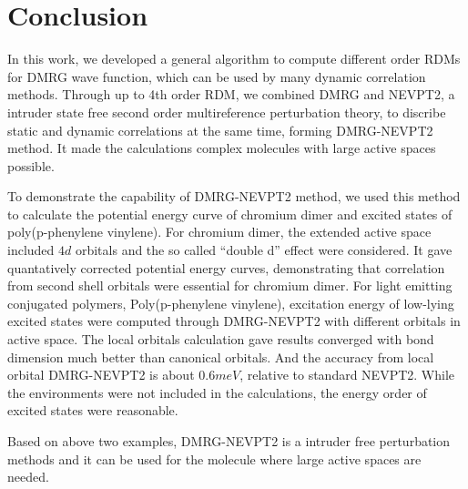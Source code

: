 
\section{Conclusion}

In this work, we developed a general algorithm to compute different order RDMs for DMRG wave function, which can be used by many dynamic correlation methods. 
Through up to 4th order RDM, we combined DMRG and NEVPT2, a intruder state free second order multireference perturbation theory,
to discribe static and dynamic correlations at the same time, forming DMRG-NEVPT2 method. It made the calculations complex molecules with large active spaces possible. 

To demonstrate the capability of DMRG-NEVPT2 method, we used this method to calculate the potential energy curve of chromium dimer and excited 
states of poly(p-phenylene vinylene). For chromium dimer, the extended active space included $4d$ orbitals and the so called ``double d'' effect 
were considered. It gave quantatively corrected potential energy curves, demonstrating that correlation from second shell orbitals were essential for chromium dimer.
For light emitting conjugated polymers, Poly(p-phenylene vinylene), excitation energy of low-lying excited states were computed through DMRG-NEVPT2 
with different orbitals in active space. The local orbitals calculation gave results converged with bond dimension much better than canonical 
orbitals. And the accuracy from local orbital DMRG-NEVPT2 is about $0.6meV$, relative to standard NEVPT2. While the environments were not included 
in the calculations, the energy order of excited states were reasonable.

Based on above two examples, DMRG-NEVPT2 is a intruder free perturbation methods and it can be used for the molecule where large active spaces are needed.
